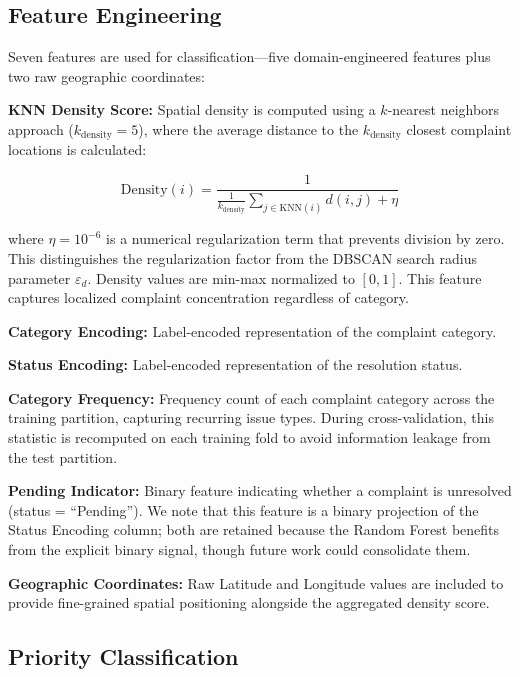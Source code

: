 \documentclass[conference]{IEEEtran}
\begin{document}
\subsection{Feature Engineering}

Seven features are used for classification---five domain-engineered features plus two raw geographic coordinates:

\textbf{KNN Density Score:} Spatial density is computed using a $k$-nearest neighbors approach ($k_{\text{density}}=5$), where the average distance to the $k_{\text{density}}$ closest complaint locations is calculated:

\begin{equation}
\text{Density}(i) = \frac{1}{\frac{1}{k_{\text{density}}}\sum_{j \in \text{KNN}(i)} d(i,j) + \eta}
\end{equation}

where $\eta = 10^{-6}$ is a numerical regularization term that prevents division by zero. This distinguishes the regularization factor from the DBSCAN search radius parameter $\varepsilon_d$. Density values are min-max normalized to $[0, 1]$. This feature captures localized complaint concentration regardless of category.

\textbf{Category Encoding:} Label-encoded representation of the complaint category.

\textbf{Status Encoding:} Label-encoded representation of the resolution status.

\textbf{Category Frequency:} Frequency count of each complaint category across the training partition, capturing recurring issue types. During cross-validation, this statistic is recomputed on each training fold to avoid information leakage from the test partition.

\textbf{Pending Indicator:} Binary feature indicating whether a complaint is unresolved (status = ``Pending''). We note that this feature is a binary projection of the Status Encoding column; both are retained because the Random Forest benefits from the explicit binary signal, though future work could consolidate them.

\textbf{Geographic Coordinates:} Raw Latitude and Longitude values are included to provide fine-grained spatial positioning alongside the aggregated density score.

\subsection{Priority Classification}
\end{document}

